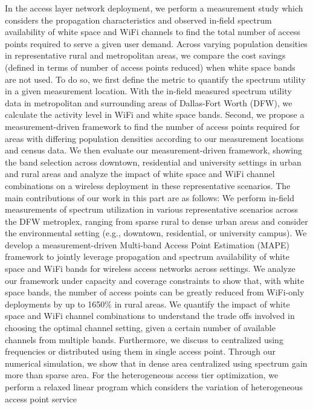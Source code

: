 In the access layer network deployment, we perform a measurement study 
which considers the propagation characteristics and observed in-field 
spectrum availability of white space and WiFi channels to find the total 
number of access points required to serve a given user demand. Across 
varying population densities in representative rural and metropolitan 
areas, we compare the cost savings (defined in terms of number of access 
points reduced) when white space bands are not used. To do so, we first 
define the metric to quantify the spectrum utility in a given measurement 
location. With the in-field measured spectrum utility data in metropolitan 
and surrounding areas of Dallas-Fort Worth (DFW), we calculate the 
activity level in WiFi and white space bands. Second, we propose a 
measurement-driven framework to find the number of access points required 
for areas with differing population densities according to our measurement 
locations and census data. We then evaluate our measurement-driven framework, 
showing the band selection across downtown, residential and university 
settings in urban and rural areas and analyze the impact of white space 
and WiFi channel combinations on a wireless deployment in these 
representative scenarios. 
The main contributions of our work in this part are as follows: We perform in-field 
measurements of spectrum utilization in various representative scenarios 
across the DFW metroplex, ranging from sparse rural to dense urban areas 
and consider the environmental setting (e.g., downtown, residential, or 
university campus). We develop a measurement-driven Multi-band Access 
Point Estimation (MAPE) framework to jointly leverage propagation and 
spectrum availability of white space and WiFi bands for wireless access 
networks across settings. We analyze our framework under capacity and 
coverage constraints to show that, with white space bands, the number 
of access points can be greatly reduced from WiFi-only deployments by 
up to 1650\% in rural areas. We quantify the impact of white space and 
WiFi channel combinations to understand the trade offs involved in choosing 
the optimal channel setting, given a certain number of available channels 
from multiple bands. Furthermore, we discuss to centralized using frequencies 
or distributed using them in single access point. Through our numerical 
simulation, we show that in dense area centralized using spectrum gain 
more than sparse area.
For the heterogeneous access tier optimization, we perform a relaxed linear 
program which considers the variation of heterogeneous access point service 

